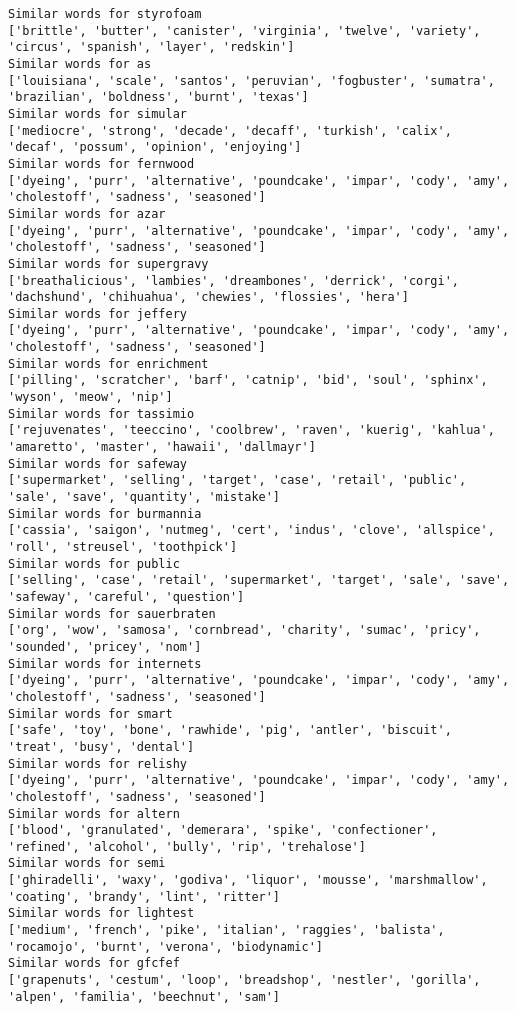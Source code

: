 \documentclass[11pt]{article}
\begin{document}
\begin{Verbatim}[commandchars=\\\{\}]
Similar words for styrofoam
['brittle', 'butter', 'canister', 'virginia', 'twelve', 'variety', 'circus', 'spanish', 'layer', 'redskin']
Similar words for as
['louisiana', 'scale', 'santos', 'peruvian', 'fogbuster', 'sumatra', 'brazilian', 'boldness', 'burnt', 'texas']
Similar words for simular
['mediocre', 'strong', 'decade', 'decaff', 'turkish', 'calix', 'decaf', 'possum', 'opinion', 'enjoying']
Similar words for fernwood
['dyeing', 'purr', 'alternative', 'poundcake', 'impar', 'cody', 'amy', 'cholestoff', 'sadness', 'seasoned']
Similar words for azar
['dyeing', 'purr', 'alternative', 'poundcake', 'impar', 'cody', 'amy', 'cholestoff', 'sadness', 'seasoned']
Similar words for supergravy
['breathalicious', 'lambies', 'dreambones', 'derrick', 'corgi', 'dachshund', 'chihuahua', 'chewies', 'flossies', 'hera']
Similar words for jeffery
['dyeing', 'purr', 'alternative', 'poundcake', 'impar', 'cody', 'amy', 'cholestoff', 'sadness', 'seasoned']
Similar words for enrichment
['pilling', 'scratcher', 'barf', 'catnip', 'bid', 'soul', 'sphinx', 'wyson', 'meow', 'nip']
Similar words for tassimio
['rejuvenates', 'teeccino', 'coolbrew', 'raven', 'kuerig', 'kahlua', 'amaretto', 'master', 'hawaii', 'dallmayr']
Similar words for safeway
['supermarket', 'selling', 'target', 'case', 'retail', 'public', 'sale', 'save', 'quantity', 'mistake']
Similar words for burmannia
['cassia', 'saigon', 'nutmeg', 'cert', 'indus', 'clove', 'allspice', 'roll', 'streusel', 'toothpick']
Similar words for public
['selling', 'case', 'retail', 'supermarket', 'target', 'sale', 'save', 'safeway', 'careful', 'question']
Similar words for sauerbraten
['org', 'wow', 'samosa', 'cornbread', 'charity', 'sumac', 'pricy', 'sounded', 'pricey', 'nom']
Similar words for internets
['dyeing', 'purr', 'alternative', 'poundcake', 'impar', 'cody', 'amy', 'cholestoff', 'sadness', 'seasoned']
Similar words for smart
['safe', 'toy', 'bone', 'rawhide', 'pig', 'antler', 'biscuit', 'treat', 'busy', 'dental']
Similar words for relishy
['dyeing', 'purr', 'alternative', 'poundcake', 'impar', 'cody', 'amy', 'cholestoff', 'sadness', 'seasoned']
Similar words for altern
['blood', 'granulated', 'demerara', 'spike', 'confectioner', 'refined', 'alcohol', 'bully', 'rip', 'trehalose']
Similar words for semi
['ghiradelli', 'waxy', 'godiva', 'liquor', 'mousse', 'marshmallow', 'coating', 'brandy', 'lint', 'ritter']
Similar words for lightest
['medium', 'french', 'pike', 'italian', 'raggies', 'balista', 'rocamojo', 'burnt', 'verona', 'biodynamic']
Similar words for gfcfef
['grapenuts', 'cestum', 'loop', 'breadshop', 'nestler', 'gorilla', 'alpen', 'familia', 'beechnut', 'sam']

\end{Verbatim}
\end{document}
